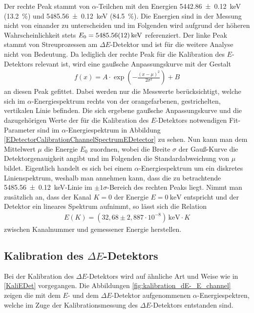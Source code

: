 Der rechte Peak stammt von $\alpha$-Teilchen mit den Energien \SI{5442,86 +- 0,12}{\kilo\electronvolt} (\SI{13,2}{\percent}) und \SI{5485,56 +- 0,12}{\kilo\electronvolt} (\SI{84,5}{\percent}).
Die Energien sind in der Messung nicht von einander zu unterscheiden und im Folgenden wird aufgrund der höheren Wahrscheinlichkeit stets $E_0 = \SI{5485,56 +- 0,12}{\kilo\electronvolt}$ referenziert.
Der linke Peak stammt von Streuprozessen am $\Delta E$-Detektor und ist für die weitere Analyse nicht von Bedeutung.
Da lediglich der rechte Peak für die Kalibration des $E$-Detektors relevant ist, wird eine gaußsche Anpassungskurve mit der Gestalt
\begin{align} \label{Gaussian}
f(x)=A\cdot\exp\left( -\frac{(x-\mu)^2}{2\sigma ^2}\right) + B
\end{align}
an diesen Peak gefittet.
Dabei werden nur die Messwerte berücksichtigt, welche sich im $\alpha$-Energiespektrum rechts von der orangefarbenen, gestrichelten, vertikalen Linie befinden.
Die sich ergebene gaußsche Anpassungskurve und die dazugehörigen Werte der für die Kalibration des $E$-Detektors notwendigen Fit-Parameter sind im $\alpha$-Energiespektrum in Abbildung \ref{EDetectorCalibrationChannelSpectrumEDetector} zu sehen.
Nun kann man dem Mittelwert $\mu$ die Energie $E_{0}$ zuordnen, wobei die Breite $\sigma$ der Gauß-Kurve die Detektorgenauigkeit angibt und im Folgenden die Standardabweichung von $\mu$ bildet.
Eigentlich handelt es sich bei einem $\alpha$-Energiespektrum um ein diskretes Linienspektrum, weshalb man annehmen kann, dass die zu betrachtende \SI{5485,56 +- 0,12}{\kilo\electronvolt}-Linie im $\pm 1\sigma$-Bereich des rechten Peaks liegt.
Nimmt man zusätzlich an, dass der Kanal $K=\num{0}$ der Energie $E=\SI{0}{\kilo\electronvolt}$ entspricht und der Detektor ein lineares Spektrum aufnimmt, so lässt sich die Relation
\begin{align}
E(K) = (32,68\pm 2,887\cdot 10^{-8})\,\text{keV} \cdot K
\end{align}
zwischen Kanalnummer und gemessener Energie herstellen.

\subsection{Kalibration des $\Delta E$-Detektors} \label{KalidEDet}

Bei der Kalibration des $\Delta E$-Detektors wird auf ähnliche Art und Weise wie in \cref{KaliEDet} vorgegangen.
Die Abbildungen \ref{fig:kalibration_dE-_E_channel} zeigen die mit dem $E$- und dem $\Delta E$-Detektor aufgenommenen $\alpha$-Energiespektren, welche im Zuge der Kalibrationsmessung des $\Delta E$-Detektors entstanden sind.

